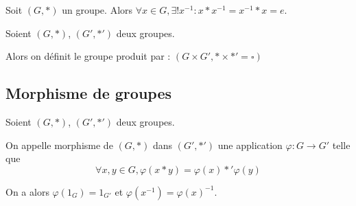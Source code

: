 \begin{proposition}

    Soit $(G,*)$ un groupe. Alors $\forall x\in G, \exists ! x^{-1} : x*x^{-1}=x^{-1}*x = e$.
\end{proposition}

\begin{definition}
  Soient $(G,*)$, $(G', *')$ deux groupes.

  Alors on définit le groupe produit par : $(G\times G', *\times *' = \square)$
\end{definition}

\subsection{Morphisme de groupes}
  \begin{definition}
      Soient $(G,*)$, $(G', *')$ deux groupes.

      On appelle morphisme de $(G,*)$ dans $(G',*')$ une application $\varphi : G \rightarrow G'$ telle que \[
        \forall x,y \in G, \varphi(x*y) = \varphi(x)*'\varphi(y)
      \]
  \end{definition}

  On a alors $\varphi(1_G) = 1_{G'}$ et $\varphi(x^{-1}) = \varphi(x)^{-1}$.
